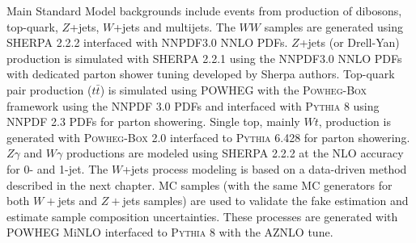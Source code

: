 %
%

Main Standard Model backgrounds include events from production of dibosons, top-quark, $Z$+jets, $W$+jets and multijets. The $WW$ samples are generated using \textsc{SHERPA} 2.2.2 interfaced with NNPDF3.0 NNLO PDFs. $Z$+jets (or Drell-Yan) production is simulated with \textsc{SHERPA} 2.2.1 using the NNPDF3.0 NNLO PDFs with dedicated parton shower tuning developed by Sherpa authors. Top-quark pair production ($t\bar{t}$) is simulated using \textsc{POWHEG} with the \textsc{Powheg-Box} framework using the NNPDF 3.0 PDFs and interfaced with \textsc{Pythia 8} using NNPDF 2.3 PDFs for parton showering. Single top, mainly $Wt$, production is generated with \textsc{Powheg-Box} 2.0 interfaced to \textsc{Pythia} 6.428 for parton showering. $Z\gamma$ and $W\gamma$ productions are modeled using \textsc{SHERPA} 2.2.2 at the NLO accuracy for 0- and 1-jet. The $W$+jets process modeling is based on a data-driven method described in the next chapter. MC samples (with the same MC generators for both $W+$jets and $Z+$jets samples) are used to validate the fake estimation and estimate sample composition uncertainties. These processes are generated with \textsc{POWHEG} MiNLO interfaced to \textsc{Pythia 8} with the AZNLO tune. 

